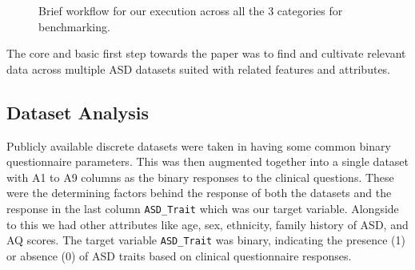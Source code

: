 \documentclass[runningheads]{llncs}
\begin{document}
\begin{figure}[!htbp]
{%
    }%
    \caption{Brief workflow for our execution across all the 3 categories for benchmarking.}
    \label{fig:workflow}
\end{figure}

The core and basic first step towards the paper was to find and cultivate relevant data across multiple ASD datasets suited with related 
features and attributes.

\subsection{Dataset Analysis}

Publicly available discrete datasets were taken in having some common binary questionnaire parameters. This was then augmented together 
into a single dataset with A1 to A9 columns as the binary responses to the clinical questions. 
These were the determining factors behind the response of both the datasets and the response in the last column \texttt{ASD\_Trait}
which was our target variable. Alongside to this we had other attributes like age, sex, ethnicity, family history of ASD, and AQ scores. 
The target variable \texttt{ASD\_Trait} was binary, indicating the presence (1) or absence (0) of ASD traits based on clinical questionnaire responses.
\end{document}

